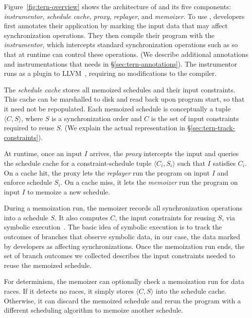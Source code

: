 Figure~\ref{fig:tern-overview} shows the architecture of \tern and its five
components: \emph{instrumentor}, \emph{schedule cache}, \emph{proxy},
\emph{replayer}, and \emph{memoizer}.  To use \tern, developers first
annotates their application by marking the input data that may affect
synchronization operations.  They then compile their program with the
\emph{instrumentor}, which intercepts standard synchronization operations
such as  so that at runtime \tern can control
these operations.  (We describe additional annotations and
instrumentations that \tern needs in \S\ref{sec:tern-annotations}).  The
instrumentor runs as a plugin to LLVM~\cite{llvm}, requiring no
modifications to the compiler.

The \emph{schedule cache} stores all memoized schedules and their input
constraints.  This cache can be marshalled to disk and read back upon
program start, so that it need not be repopulated.
Each memoized schedule
is conceptually a tuple $\langle C, S \rangle$, where $S$ is a
synchronization order and $C$ is the set of input constraints required to reuse
$S$. (We explain the actual representation in
\S\ref{sec:tern-track-constraints}).

At runtime, once an input $I$ arrives, the \emph{proxy} intercepts the
input and queries the schedule cache for a constraint-schedule tuple
$\langle C_i, S_i \rangle$ such that $I$ satisfies $C_i$.  On a cache hit,
the proxy lets the \emph{replayer} run the program on input $I$ and enforce
schedule $S_i$.  On a cache miss, it lets the \emph{memoizer} run the
program on input $I$ to memoize a new schedule.

During a memoization run, the memoizer records all synchronization
operations into a schedule $S$.  It also computes $C$, the input
constraints for reusing $S$, via symbolic execution~\cite{klee:osdi08}.
The basic idea of symbolic execution is to track the outcomes of branches
that observe symbolic data, in our case, the data marked by developers as
affecting synchronizations.  Once the memoization run ends, the set of
branch outcomes we collected describes the input constraints needed to reuse
the memoized schedule.

For determinism, the memoizer can optionally check a memoization run for
data races.  If it detects no races, it simply stores $\langle C, S
\rangle$ into the schedule cache.  Otherwise, it can discard the memoized
schedule and rerun the program with a different scheduling algorithm to
memoize another schedule.

